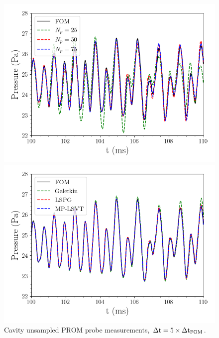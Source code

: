 \begin{figure}
	\begin{minipage}{0.49\linewidth}
		\includegraphics[width=0.99\linewidth]{Chapters/HPROMResults/Images/cavity/unsampled/pressure_probe_unsampled_modes.png}
	\end{minipage}
	\begin{minipage}{0.49\linewidth}
		\includegraphics[width=0.99\linewidth]{Chapters/HPROMResults/Images/cavity/unsampled/pressure_probe_unsampled_methods.png}
	\end{minipage}
	\caption{\label{fig:cavityUnsampledROMProbes}Cavity unsampled PROM probe measurements, $\Delta \text{t} = 5 \times \Delta \text{t}_{\text{FOM}}$.}
\end{figure}

